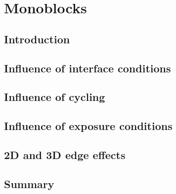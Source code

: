 \setchapterpreamble[u]{\margintoc}
\chapter{Monoblocks}
\section{Introduction}
\section{Influence of interface conditions}

\section{Influence of cycling}
\section{Influence of exposure conditions}

\section{2D and 3D edge effects}
\section{Summary}